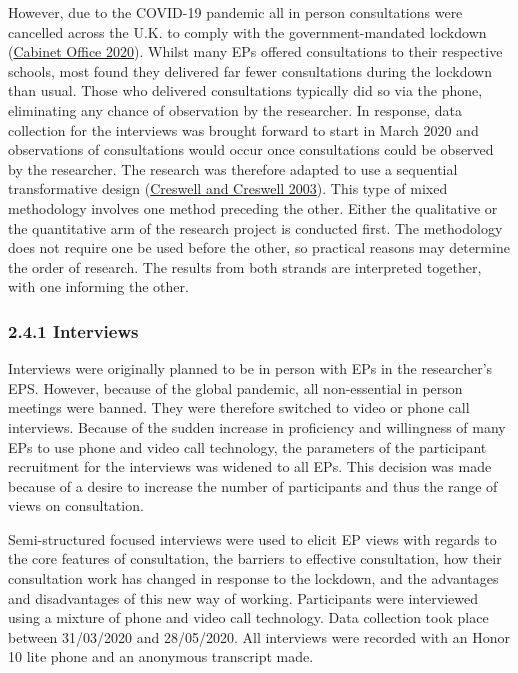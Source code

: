 \documentclass[
]{article}
\begin{document}
However, due to the COVID-19 pandemic all in person consultations were
cancelled across the U.K. to comply with the government-mandated
lockdown
(\protect\hyperlink{ref-cabinetofficeStayingHomeAway2020}{Cabinet Office
2020}). Whilst many EPs offered consultations to their respective
schools, most found they delivered far fewer consultations during the
lockdown than usual. Those who delivered consultations typically did so
via the phone, eliminating any chance of observation by the researcher.
In response, data collection for the interviews was brought forward to
start in March 2020 and observations of consultations would occur once
consultations could be observed by the researcher. The research was
therefore adapted to use a sequential transformative design
(\protect\hyperlink{ref-creswellResearchDesignQualitative2003a}{Creswell
and Creswell 2003}). This type of mixed methodology involves one method
preceding the other. Either the qualitative or the quantitative arm of
the research project is conducted first. The methodology does not
require one be used before the other, so practical reasons may determine
the order of research. The results from both strands are interpreted
together, with one informing the other.

\hypertarget{interviews-1}{%
\subsubsection{2.4.1 Interviews}\label{interviews-1}}

Interviews were originally planned to be in person with EPs in the
researcher's EPS. However, because of the global pandemic, all
non-essential in person meetings were banned. They were therefore
switched to video or phone call interviews. Because of the sudden
increase in proficiency and willingness of many EPs to use phone and
video call technology, the parameters of the participant recruitment for
the interviews was widened to all EPs. This decision was made because of
a desire to increase the number of participants and thus the range of
views on consultation.

Semi-structured focused interviews were used to elicit EP views with
regards to the core features of consultation, the barriers to effective
consultation, how their consultation work has changed in response to the
lockdown, and the advantages and disadvantages of this new way of
working. Participants were interviewed using a mixture of phone and
video call technology. Data collection took place between 31/03/2020 and
28/05/2020. All interviews were recorded with an Honor 10 lite phone and
an anonymous transcript made.
\end{document}
